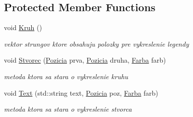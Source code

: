 \subsection*{Protected Member Functions}
\begin{DoxyCompactItemize}
\item 
\hypertarget{class_kreslic_a09d5dd2518b9ccf301d0c92e15ec02f5}{void \hyperlink{class_kreslic_a09d5dd2518b9ccf301d0c92e15ec02f5}{Kruh} ()}\label{class_kreslic_a09d5dd2518b9ccf301d0c92e15ec02f5}

\begin{DoxyCompactList}\small\item\em vektor strungov ktore obsahuju polozky pre vykreslenie legendy \end{DoxyCompactList}\item 
\hypertarget{class_kreslic_a44f827cd0eda38a2067cab7657fd537e}{void \hyperlink{class_kreslic_a44f827cd0eda38a2067cab7657fd537e}{Stvorec} (\hyperlink{struct_pozicia}{Pozicia} prva, \hyperlink{struct_pozicia}{Pozicia} druha, \hyperlink{struct_farba}{Farba} farb)}\label{class_kreslic_a44f827cd0eda38a2067cab7657fd537e}

\begin{DoxyCompactList}\small\item\em metoda ktora sa stara o vykreslenie kruhu \end{DoxyCompactList}\item 
\hypertarget{class_kreslic_afba0442f11b078d7272fb81047480fbf}{void \hyperlink{class_kreslic_afba0442f11b078d7272fb81047480fbf}{Text} (std\-::string text, \hyperlink{struct_pozicia}{Pozicia} poz, \hyperlink{struct_farba}{Farba} farb)}\label{class_kreslic_afba0442f11b078d7272fb81047480fbf}

\begin{DoxyCompactList}\small\item\em metoda ktora sa stara o vykreslenie stvorca \end{DoxyCompactList}\end{DoxyCompactItemize}
